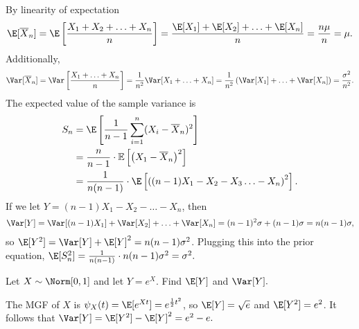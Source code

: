\documentclass[a4paper]{article}
\begin{document}
\begin{Solution}
	By linearity of expectation
	\begin{align*}
		\E[\overline{X}_n] = \E \left[ \frac{X_1 + X_2 + \ldots + X_n}{n} \right] = \frac{\E[X_1] + \E[X_2] + \ldots + \E[X_n]}{n} = \frac{n \mu}{n} = \mu.
	\end{align*}
	Additionally,
	\begin{align*}
		\Var[\overline{X}_n] = \Var \left[ \frac{X_1 + \ldots + X_n}{n} \right] = \frac{1}{n^2} \Var[X_1 + \ldots + X_n] = \frac{1}{n^2} \left( \Var[X_1] + \ldots + \Var[X_n] \right) = \frac{\sigma^2}{n^2}.
	\end{align*}
	The expected value of the sample variance is
	\begin{align*}
		S_n &= \E \left[ \frac{1}{n - 1} \sum_{i = 1}^n (X_i - \overline{X}_n)^2 \right]
		 \\ &= \frac{n}{n - 1} \cdot \mathbb{E}\left[ \left( X_1 - \overline{X}_n \right)^2 \right]
		 \\ &= \frac{1}{n(n - 1)}\cdot \E \left[ \left( (n - 1)X_1 - X_2 - X_3\ldots - X_n \right)^2 \right].
	\end{align*}
	If we let $Y = (n - 1)X_1 - X_2 - \ldots - X_n$, then 
	\begin{align*}
		\Var[Y] = \Var[(n - 1)X_1] + \Var[X_2] + \ldots + \Var[X_n] = (n - 1)^2 \sigma + (n - 1) \sigma = n (n - 1) \sigma,
	\end{align*}
	so $\E[Y^2] = \Var[Y] + \E[Y]^2 = n (n - 1) \sigma^2$. Plugging this into the prior equation, $\E[S_n^2] = \frac{1}{n (n - 1)} \cdot n(n -1)\sigma^2 = \sigma^2.$
\end{Solution}
\begin{Exercise}
\end{Exercise}
\begin{Exercise}
	Let $X \sim \Norm[0, 1]$ and let $Y = e^{X}$. Find $\E[Y]$ and $\Var[Y].$ 
\end{Exercise}
\begin{Solution}
	The MGF of $X$ is $\psi_X(t) = \E[e^{Xt}] = e^{\frac{1}{2}t^2}$, so 
	$\E[Y] = \sqrt{e}$ and $\E[Y^2] = e^2$. It follows that $\Var[Y] = \E[Y^2] - \E[Y]^2 = e^2 - e.$
\end{Solution}
\end{document}
